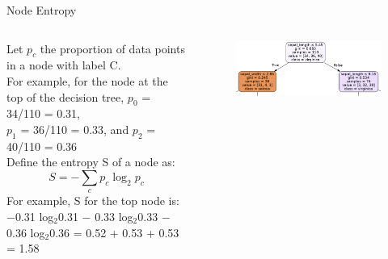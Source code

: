 \documentclass[aspectratio=169]{../latex_main/tntbeamer}  %
\begin{document}
	\begin{frame}{Node Entropy}
	    \begin{columns}
	        \begin{column}{.5\textwidth}
	                Let $p_c$ the proportion of data points in a node with label C.\\
	                \bigskip
	                For example, for the node at the top of the decision tree, $p_0$ = 34/110 = 0.31,\\
                    $p_1$ = 36/110 = 0.33, and $p_2$ = 40/110 = 0.36\\
                    \bigskip
                    Define the entropy S of a node as:
                    \begin{equation*}
                        S = -\sum\limits_c p_c\log_2p_c
                    \end{equation*}
                    For example, S for the top node is:
                    −0.31 log$_2$⁡0.31 − 0.33 log$_2$⁡0.33 − 0.36 log$_2$⁡0.36
                    = 0.52 + 0.53 + 0.53 = 1.58
	        \end{column}
	        
	        \begin{column}{.5\textwidth}
	                \begin{figure}
	                    \centering
	                    \includegraphics[scale=.5]{Bild47}
	                \end{figure}
	        \end{column}
	    \end{columns}
	\end{frame}
	
\end{document}
